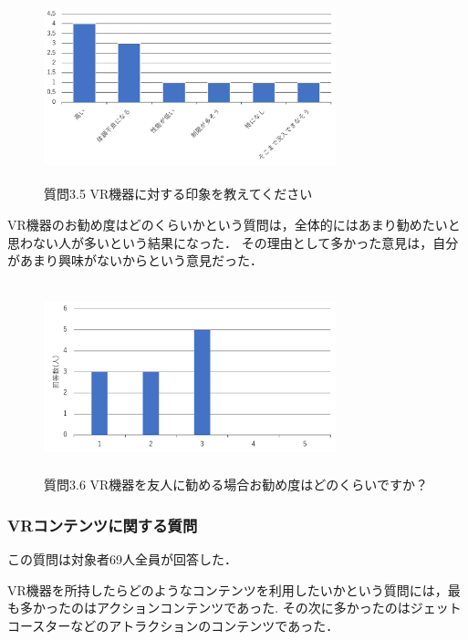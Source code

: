 \documentclass[12pt,a4j]{ltjsarticle}
\begin{document}
\begin{figure}[h]
\begin{center}
 \includegraphics[clip,width=85mm,height=55mm]{
 アンケート2_3_5.pdf}
\end{center}
 \caption{質問3.5 VR機器に対する印象を教えてください}
 \label{fig:アンケート2_3_5.pdf}
\end{figure}

VR機器のお勧め度はどのくらいかという質問は，全体的にはあまり勧めたいと思わない人が多いという結果になった．
その理由として多かった意見は，自分があまり興味がないからという意見だった．

\begin{figure}[h]
\begin{center}
 \includegraphics[clip,width=85mm,height=55mm]{
 アンケート2_3_6.pdf}
\end{center}
 \caption{質問3.6 VR機器を友人に勧める場合お勧め度はどのくらいですか？}
 \label{fig:アンケート2_3_6.pdf}
\end{figure}

\subsubsection{VRコンテンツに関する質問}
この質問は対象者69人全員が回答した．

VR機器を所持したらどのようなコンテンツを利用したいかという質問には，最も多かったのはアクションコンテンツであった.
その次に多かったのはジェットコースターなどのアトラクションのコンテンツであった．
\end{document}
